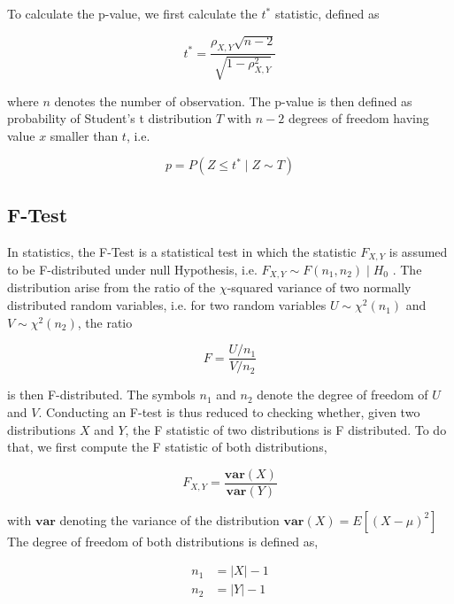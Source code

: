 \documentclass[pdftex,12pt,a4paper]{report}
\begin{document}
To calculate  the p-value, we  first calculate the $t^*$ statistic, defined  as

\begin{equation}
t^* = \frac{\rho_{X,Y} \sqrt{n - 2}}{\sqrt{1 - \rho_{X,Y}^2}}
\end{equation}

where $n$ denotes the number of observation. The p-value is then defined as probability of Student's t distribution $T$ with $n - 2$ degrees of freedom having value $x$ smaller than $t$, i.e.

\begin{equation}
p = P(Z \leq t^* \mid Z \sim T)
\end{equation}

\subsection{F-Test}

In statistics, the F-Test is a statistical test in which the statistic $F_{X,Y} $ is assumed to be F-distributed under null Hypothesis, i.e. $F_{X,Y} \sim F(n_1, n_2) \mid  H_0$ \cite{fahrmeir2016statistik}. The distribution arise from the ratio of the $\chi$-squared variance of two normally distributed random variables, i.e. for two random variables $U \sim \chi^2(n_1)$  and $V \sim \chi^2(n_2)$, the ratio

\begin{equation}
F = \frac{U / n_1}{V / n_2}
\end{equation}

is then F-distributed. The symbols $n_1$ and $n_2$ denote the degree of freedom of $U$ and $V$. Conducting an F-test is thus reduced to checking whether, given two distributions $X$ and $Y$, the F statistic of two distributions is F distributed. To do that, we first compute the F statistic  of both distributions, 

\begin{equation}
F_{X,Y} = \frac{\mathbf{var}(X)}{\mathbf{var}(Y)}
\end{equation}

with $\mathbf{var}$ denoting the variance of the distribution $\mathbf{var}(X) = E[(X - \mu)^2]$
The degree of freedom of both distributions is defined as,

\begin{align}
  n_1 &= \vert X \vert - 1 \label{eq:ftest_dof_x} \\
  n_2 &= \vert Y \vert - 1\label{eq:ftest_dof_y}
\end{align}
\end{document}
